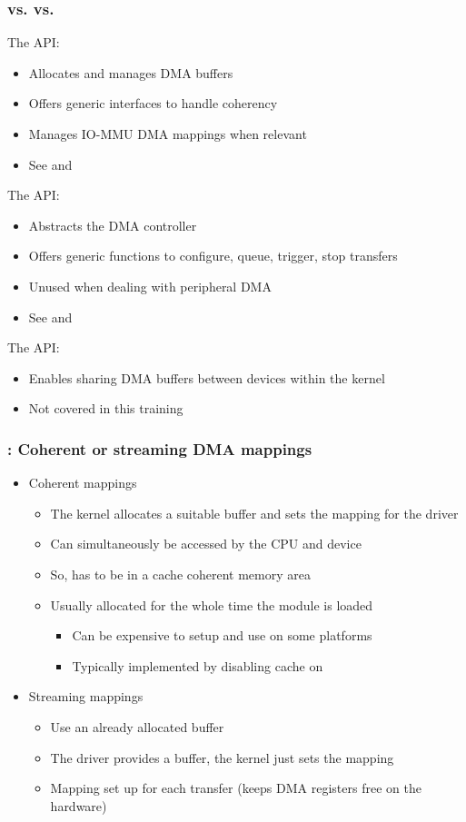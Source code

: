 \begin{frame}
  \frametitle{ vs.  vs. }
  The  API:
  \begin{itemize}
  \item Allocates and manages DMA buffers
  \item Offers generic interfaces to handle coherency
  \item Manages IO-MMU DMA mappings when relevant
  \item See  and
  \end{itemize}
  The  API:
  \begin{itemize}
  \item Abstracts the DMA controller
  \item Offers generic functions to configure, queue, trigger, stop
    transfers
  \item Unused when dealing with peripheral DMA
  \item See  and
  \end{itemize}
  The  API:
  \begin{itemize}
  \item Enables sharing DMA buffers between devices within the kernel
  \item Not covered in this training
  \end{itemize}
\end{frame}

\begin{frame}
  \frametitle{: Coherent or streaming DMA mappings}
  \begin{itemize}
  \item Coherent mappings
    \begin{itemize}
    \item The kernel allocates a suitable buffer and sets the mapping
      for the driver
    \item Can simultaneously be accessed by the CPU and device
    \item So, has to be in a cache coherent memory area
    \item Usually allocated for the whole time the module is loaded
      \begin{itemize}
      \item Can be expensive to setup and use on some platforms
      \item Typically implemented by disabling cache on 
      \end{itemize}
    \end{itemize}
  \item Streaming mappings
    \begin{itemize}
    \item Use an already allocated buffer
    \item The driver provides a buffer, the kernel just sets the mapping
    \item Mapping set up for each transfer (keeps DMA registers free on
      the hardware)
    \end{itemize}
  \end{itemize}
\end{frame}

